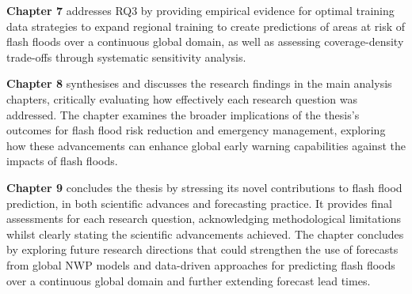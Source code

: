 \vspace{3em}
\textbf{Chapter 7}\marginpara{\textcolor{colour_chapter7}{Main Analysis Chapter - Towards predictions over a continuous global domain: global implementation of the regionally-trained models}} addresses RQ3 by providing empirical evidence for optimal training data strategies to expand regional training to create predictions of areas at risk of flash floods over a continuous global domain, as well as assessing coverage-density trade-offs through systematic sensitivity analysis.

\textbf{Chapter 8} synthesises and discusses the research findings in the main analysis chapters, critically evaluating how effectively each research question was addressed. The chapter examines the broader implications of the thesis's outcomes for flash flood risk reduction and emergency management, exploring how these advancements can enhance global early warning capabilities against the impacts of flash floods. 

\textbf{Chapter 9} concludes the thesis by stressing its novel contributions to flash flood prediction, in both scientific advances and forecasting practice. It provides final assessments for each research question, acknowledging methodological limitations whilst clearly stating the scientific advancements achieved. The chapter concludes by exploring future research directions that could strengthen the use of forecasts from global NWP models and data-driven approaches for predicting flash floods over a continuous global domain and further extending forecast lead times. 